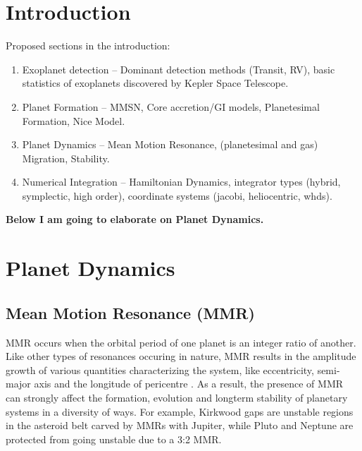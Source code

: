 \documentclass[12pt,letter]{aastex}
\date{Draft version: \today}
\begin{document}
\section{Introduction}

Proposed sections in the introduction:
\begin{enumerate}
\item Exoplanet detection -- Dominant detection methods (Transit, RV), basic statistics of exoplanets discovered by Kepler Space Telescope.
\item Planet Formation -- MMSN, Core accretion/GI models, Planetesimal Formation, Nice Model. 
\item Planet Dynamics -- Mean Motion Resonance, (planetesimal and gas) Migration, Stability.
\item Numerical Integration -- Hamiltonian Dynamics, integrator types (hybrid, symplectic, high order), coordinate systems (jacobi, heliocentric, whds).
\end{enumerate}

\textbf{Below I am going to elaborate on Planet Dynamics. }

\section{Planet Dynamics}
\subsection{Mean Motion Resonance (MMR)}
\label{sec:MMR}
MMR occurs when the orbital period of one planet is an integer ratio of another. 
Like other types of resonances occuring in nature, MMR results in the amplitude growth of various quantities characterizing the system, like eccentricity, semi-major axis and the longitude of pericentre \citep{SSD1999}. 
As a result, the presence of MMR can strongly affect the formation, evolution and longterm stability of planetary systems in a diversity of ways.
For example, Kirkwood gaps are unstable regions in the asteroid belt carved by MMRs with Jupiter, while Pluto and Neptune are protected from going unstable due to a 3:2 MMR. 
\end{document}
